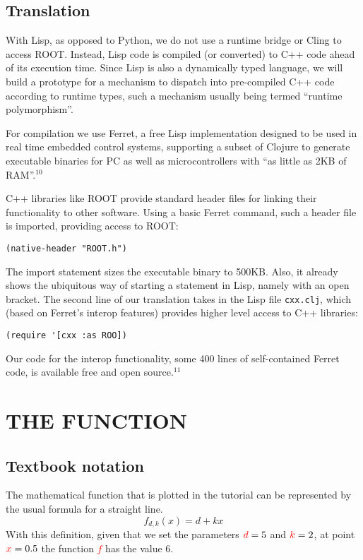 \documentclass{IEEEcsmag}
\begin{document}
\subsection{Translation}
With Lisp, as opposed to Python, we do not use a runtime bridge or Cling to access ROOT. Instead, Lisp code is compiled (or converted) to C++ code ahead of its execution time. Since Lisp is also a dynamically typed language, we will build a prototype for a mechanism to dispatch into pre-compiled C++ code according to runtime types, such a mechanism usually being termed “runtime polymorphism”.

For compilation we use Ferret, a free Lisp implementation designed to be used in real time embedded control systems, supporting a subset of Clojure  to generate executable binaries for PC as well as microcontrollers with “as little as 2KB of RAM”.$^{10}$

C++ libraries like ROOT provide standard header files for linking their functionality to other software. Using a basic Ferret command, such a header file is imported, providing access to ROOT:
{\color{blue}\begin{verbatim}
(native-header "ROOT.h")
\end{verbatim}}
The import statement sizes the executable binary to 500KB. Also, it already shows the ubiquitous way of starting a statement in Lisp, namely with an open bracket. The second line of our translation takes in the Lisp file \texttt{cxx.clj}, which (based on Ferret’s interop features) provides higher level access to C++ libraries:
{\color{blue}\begin{verbatim}
(require '[cxx :as ROO])
\end{verbatim}}
Our code for the interop functionality, some 400 lines of self-contained Ferret code, is available free and open source.$^{11}$

\section{THE FUNCTION}
\subsection{Textbook notation}
The mathematical function that is plotted in the tutorial can be represented by the usual formula for a straight line.
{\color{red}
\begin{equation}
f_{d,k}(x)=d+kx
\end{equation}}
With this definition, given that we set the parameters \(\textcolor{red}{d} = 5\) and \(\textcolor{red}{k} = 2\), at point \(\textcolor{red}{x} = 0.5\) the function \textcolor{red}{$f$} has the value 6.
\end{document}
